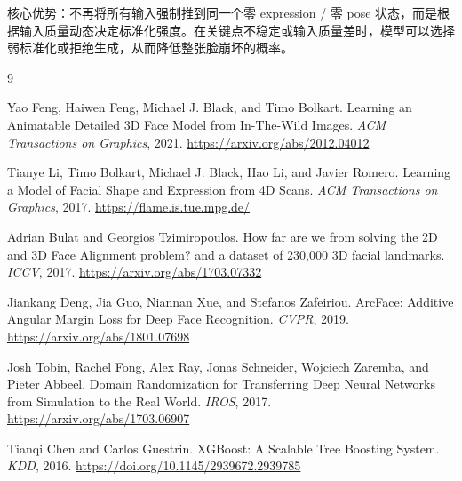 \documentclass[UTF8,12pt,fontset=fandol]{ctexart}
\begin{document}
核心优势：不再将所有输入强制推到同一个零 expression / 零 pose 状态，而是根据输入质量动态决定标准化强度。在关键点不稳定或输入质量差时，模型可以选择弱标准化或拒绝生成，从而降低整张脸崩坏的概率。

\begin{thebibliography}{9}

Yao Feng, Haiwen Feng, Michael J. Black, and Timo Bolkart.
\newblock Learning an Animatable Detailed 3D Face Model from In-The-Wild Images.
\newblock \emph{ACM Transactions on Graphics}, 2021.
\newblock \url{https://arxiv.org/abs/2012.04012}

Tianye Li, Timo Bolkart, Michael J. Black, Hao Li, and Javier Romero.
\newblock Learning a Model of Facial Shape and Expression from 4D Scans.
\newblock \emph{ACM Transactions on Graphics}, 2017.
\newblock \url{https://flame.is.tue.mpg.de/}

Adrian Bulat and Georgios Tzimiropoulos.
\newblock How far are we from solving the 2D and 3D Face Alignment problem? and a dataset of 230,000 3D facial landmarks.
\newblock \emph{ICCV}, 2017.
\newblock \url{https://arxiv.org/abs/1703.07332}

Jiankang Deng, Jia Guo, Niannan Xue, and Stefanos Zafeiriou.
\newblock ArcFace: Additive Angular Margin Loss for Deep Face Recognition.
\newblock \emph{CVPR}, 2019.
\newblock \url{https://arxiv.org/abs/1801.07698}

Josh Tobin, Rachel Fong, Alex Ray, Jonas Schneider, Wojciech Zaremba, and Pieter Abbeel.
\newblock Domain Randomization for Transferring Deep Neural Networks from Simulation to the Real World.
\newblock \emph{IROS}, 2017.
\newblock \url{https://arxiv.org/abs/1703.06907}

Tianqi Chen and Carlos Guestrin.
\newblock XGBoost: A Scalable Tree Boosting System.
\newblock \emph{KDD}, 2016.
\newblock \url{https://doi.org/10.1145/2939672.2939785}

\end{thebibliography}
\end{document}
